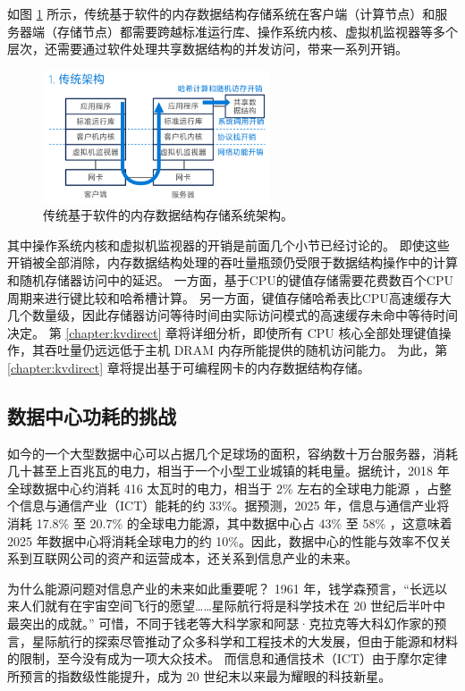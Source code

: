 如图 \ref{background:fig:kvdirect_traditional} 所示，传统基于软件的内存数据结构存储系统在客户端（计算节点）和服务器端（存储节点）都需要跨越标准运行库、操作系统内核、虚拟机监视器等多个层次，还需要通过软件处理共享数据结构的并发访问，带来一系列开销。


\begin{figure}[htbp]
	\centering
	\includegraphics[width=0.6\textwidth]{figures/kvdirect_traditional.png}
	\caption{传统基于软件的内存数据结构存储系统架构。}
	\label{background:fig:kvdirect_traditional}
\end{figure}

其中操作系统内核和虚拟机监视器的开销是前面几个小节已经讨论的。
即使这些开销被全部消除，内存数据结构处理的吞吐量瓶颈仍受限于数据结构操作中的计算和随机存储器访问中的延迟。
一方面，基于CPU的键值存储需要花费数百个CPU周期来进行键比较和哈希槽计算。
另一方面，键值存储哈希表比CPU高速缓存大几个数量级，因此存储器访问等待时间由实际访问模式的高速缓存未命中等待时间决定。
第 \ref{chapter:kvdirect} 章将详细分析，即使所有 CPU 核心全部处理键值操作，其吞吐量仍远远低于主机 DRAM 内存所能提供的随机访问能力。
为此，第 \ref{chapter:kvdirect} 章将提出基于可编程网卡的内存数据结构存储。

\iffalse
\subsection{数据中心功耗的挑战}

如今的一个大型数据中心可以占据几个足球场的面积，容纳数十万台服务器，消耗几十甚至上百兆瓦的电力，相当于一个小型工业城镇的耗电量。据统计，2018 年全球数据中心约消耗 416 太瓦时的电力，相当于 2\% 左右的全球电力能源 \cite{datacenter-energy}，占整个信息与通信产业（ICT）能耗的约 33\%。据预测，2025 年，信息与通信产业将消耗 17.8\% 至 20.7\% 的全球电力能源，其中数据中心占 43\% 至 58\% \cite{power-consumption}，这意味着 2025 年数据中心将消耗全球电力的约 10\%。因此，数据中心的性能与效率不仅关系到互联网公司的资产和运营成本，还关系到信息产业的未来。

为什么能源问题对信息产业的未来如此重要呢？
1961 年，钱学森预言，``长远以来人们就有在宇宙空间飞行的愿望……星际航行将是科学技术在 20 世纪后半叶中最突出的成就。'' \cite{qianxuesen}
可惜，不同于钱老等大科学家和阿瑟·克拉克等大科幻作家的预言，星际航行的探索尽管推动了众多科学和工程技术的大发展，但由于能源和材料的限制，至今没有成为一项大众技术。
而信息和通信技术（ICT）由于摩尔定律所预言的指数级性能提升，成为 20 世纪末以来最为耀眼的科技新星。

